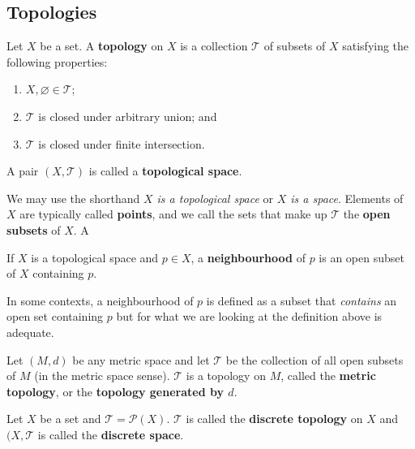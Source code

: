 
\subsection{Topologies}

\begin{definition}[Topology]
	Let $X$ be a set. 
	A \textbf{topology} on $X$ is a collection $\mathcal T$ of subsets of $X$
	satisfying the following properties:
	\begin{enumerate}
		\item $X, \varnothing \in \mathcal T$;
		\item $\mathcal T$ is closed under arbitrary union; and
		\item $\mathcal T$ is closed under finite intersection.
	\end{enumerate}
	A pair $(X, \mathcal T)$ is called a \textbf{topological space}. 
\end{definition}

\begin{remark}
	We may use the shorthand \emph{$X$ is a topological space}
	or \emph{$X$ is a space}.
	Elements of $X$ are typically called \textbf{points}, 
	and we call the sets that make up $\mathcal T$ the 
	\textbf{open subsets} of $X$. A
\end{remark}

\begin{definition}[Neighbourhood]
	If $X$ is a topological space and $p \in X$, a \textbf{neighbourhood} of $p$
	is an open subset of $X$ containing $p$.
\end{definition}

\begin{remark}
	In some contexts, a neighbourhood of $p$ is defined as a subset that
	\emph{contains } an open set containing $p$ but for what we are looking
	at the definition above is adequate.
\end{remark}

\begin{example}
	Let $(M, d)$ be any metric space
	and let $\mathcal T$ be the collection of all open subsets of $M$
	(in the metric space sense).
	$\mathcal T$ is a topology on $M$, called the \textbf{metric topology},
	or the \textbf{topology generated by $d$}.
\end{example}

\begin{example}
	Let $X$ be a set and $\mathcal T = \mathcal P(X)$.
	$\mathcal T$ is called the \textbf{discrete topology} on $X$
	and $(X, \mathcal T$ is called the \textbf{discrete space}.
\end{example}

